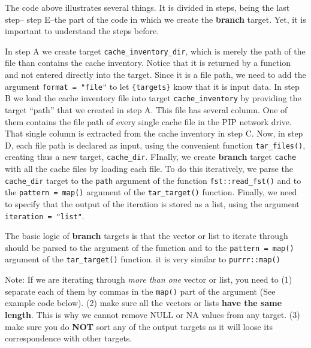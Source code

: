 \documentclass[
]{book}
\begin{document}
The code above illustrates several things. It is divided in steps, being the
last step-- step E--the part of the code in which we create the \textbf{branch}
target. Yet, it is important to understand the steps before.

In step A we create target \texttt{cache\_inventory\_dir}, which is merely the path of
the file than contains the cache inventory. Notice that it is returned by a
function and not entered directly into the target. Since it is a file path, we
need to add the argument \texttt{format\ =\ "file"} to let \texttt{\{targets\}} know that it is
input data. In step B we load the cache inventory file into target
\texttt{cache\_inventory} by providing the target ``path'' that we created in step A. This
file has several column. One of them contains the file path of every single
cache file in the PIP network drive. That single column is extracted from the
cache inventory in step C. Now, in step D, each file path is declared as input,
using the convenient function \texttt{tar\_files()}, creating thus a new target,
\texttt{cache\_dir}. FInally, we create \textbf{branch} target \texttt{cache} with all the cache
files by loading each file. To do this iteratively, we parse the \texttt{cache\_dir}
target to the \texttt{path} argument of the function \texttt{fst::read\_fst()} and to the
\texttt{pattern\ =\ map()} argument of the \texttt{tar\_target()} function. Finally, we need to
specify that the output of the iteration is stored as a list, using the argument
\texttt{iteration\ =\ "list"}.

The basic logic of \textbf{branch} targets is that the vector or list to iterate
through should be parsed to the argument of the function and to the
\texttt{pattern\ =\ map()} argument of the \texttt{tar\_target()} function. it is very similar to
\texttt{purrr::map()}

{Note:} If we are iterating through \emph{more than one} vector or
list, you need to (1) separate each of them by commas in the \texttt{map()} part of the
argument (See example code below). (2) make sure all the vectors or lists \textbf{have
the same length}. This is why we cannot remove NULL or NA values from any
target. (3) make sure you do \textbf{NOT} sort any of the output targets as it will
loose its correspondence with other targets.
\end{document}
